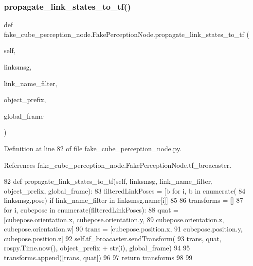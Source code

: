 \subsubsection{\texorpdfstring{propagate\+\_\+link\+\_\+states\+\_\+to\+\_\+tf()}{propagate\_link\_states\_to\_tf()}}
{\footnotesize\ttfamily def fake\+\_\+cube\+\_\+perception\+\_\+node.\+Fake\+Perception\+Node.\+propagate\+\_\+link\+\_\+states\+\_\+to\+\_\+tf (\begin{DoxyParamCaption}\item[{}]{self,  }\item[{}]{linksmsg,  }\item[{}]{link\+\_\+name\+\_\+filter,  }\item[{}]{object\+\_\+prefix,  }\item[{}]{global\+\_\+frame }\end{DoxyParamCaption})}



Definition at line 82 of file fake\+\_\+cube\+\_\+perception\+\_\+node.\+py.



References fake\+\_\+cube\+\_\+perception\+\_\+node.\+Fake\+Perception\+Node.\+tf\+\_\+broacaster.


\begin{DoxyCode}
82     \textcolor{keyword}{def }propagate\_link\_states\_to\_tf(self, linksmsg,  link\_name\_filter, object\_prefix, global\_frame):
83         filteredLinkPoses = [b \textcolor{keywordflow}{for} i, b \textcolor{keywordflow}{in} enumerate(
84             linksmsg.pose) \textcolor{keywordflow}{if} link\_name\_filter \textcolor{keywordflow}{in} linksmsg.name[i]]
85 
86         transforms = []
87         \textcolor{keywordflow}{for} i, cubepose \textcolor{keywordflow}{in} enumerate(filteredLinkPoses):
88             quat = [cubepose.orientation.x, cubepose.orientation.y,
89                     cubepose.orientation.z, cubepose.orientation.w]
90             trans = [cubepose.position.x,
91                      cubepose.position.y, cubepose.position.z]
92             self.tf\_broacaster.sendTransform(
93                 trans, quat, rospy.Time.now(), object\_prefix + str(i), global\_frame)
94 
95             transforms.append([trans, quat])
96 
97         \textcolor{keywordflow}{return} transforms
98 
99 
\end{DoxyCode}
\mbox{\label{classfake__cube__perception__node_1_1FakePerceptionNode_ac1127eae8d2eda994b22873529bd198f}} 
